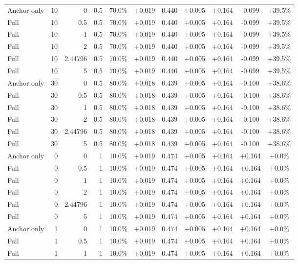 \begin{table}[htbp]
\begin{tabular}{lrrrccccccc}
Anchor only & 10 & 0 & 0.5 & 70.0\% & +0.019 & 0.440 & +0.005 & +0.164 & -0.099 & +39.5\% \\
Full & 10 & 0.5 & 0.5 & 70.0\% & +0.019 & 0.440 & +0.005 & +0.164 & -0.099 & +39.5\% \\
Full & 10 & 1 & 0.5 & 70.0\% & +0.019 & 0.440 & +0.005 & +0.164 & -0.099 & +39.5\% \\
Full & 10 & 2 & 0.5 & 70.0\% & +0.019 & 0.440 & +0.005 & +0.164 & -0.099 & +39.5\% \\
Full & 10 & 2.44796 & 0.5 & 70.0\% & +0.019 & 0.440 & +0.005 & +0.164 & -0.099 & +39.5\% \\
Full & 10 & 5 & 0.5 & 70.0\% & +0.019 & 0.440 & +0.005 & +0.164 & -0.099 & +39.5\% \\
Anchor only & 30 & 0 & 0.5 & 80.0\% & +0.018 & 0.439 & +0.005 & +0.164 & -0.100 & +38.6\% \\
Full & 30 & 0.5 & 0.5 & 80.0\% & +0.018 & 0.439 & +0.005 & +0.164 & -0.100 & +38.6\% \\
Full & 30 & 1 & 0.5 & 80.0\% & +0.018 & 0.439 & +0.005 & +0.164 & -0.100 & +38.6\% \\
Full & 30 & 2 & 0.5 & 80.0\% & +0.018 & 0.439 & +0.005 & +0.164 & -0.100 & +38.6\% \\
Full & 30 & 2.44796 & 0.5 & 80.0\% & +0.018 & 0.439 & +0.005 & +0.164 & -0.100 & +38.6\% \\
Full & 30 & 5 & 0.5 & 80.0\% & +0.018 & 0.439 & +0.005 & +0.164 & -0.100 & +38.6\% \\
Anchor only & 0 & 0 & 1 & 10.0\% & +0.019 & 0.474 & +0.005 & +0.164 & +0.164 & +0.0\% \\
Full & 0 & 0.5 & 1 & 10.0\% & +0.019 & 0.474 & +0.005 & +0.164 & +0.164 & +0.0\% \\
Full & 0 & 1 & 1 & 10.0\% & +0.019 & 0.474 & +0.005 & +0.164 & +0.164 & +0.0\% \\
Full & 0 & 2 & 1 & 10.0\% & +0.019 & 0.474 & +0.005 & +0.164 & +0.164 & +0.0\% \\
Full & 0 & 2.44796 & 1 & 10.0\% & +0.019 & 0.474 & +0.005 & +0.164 & +0.164 & +0.0\% \\
Full & 0 & 5 & 1 & 10.0\% & +0.019 & 0.474 & +0.005 & +0.164 & +0.164 & +0.0\% \\
Anchor only & 1 & 0 & 1 & 10.0\% & +0.019 & 0.474 & +0.005 & +0.164 & +0.164 & +0.0\% \\
Full & 1 & 0.5 & 1 & 10.0\% & +0.019 & 0.474 & +0.005 & +0.164 & +0.164 & +0.0\% \\
Full & 1 & 1 & 1 & 10.0\% & +0.019 & 0.474 & +0.005 & +0.164 & +0.164 & +0.0\% \\

\end{tabular}
\end{table}

